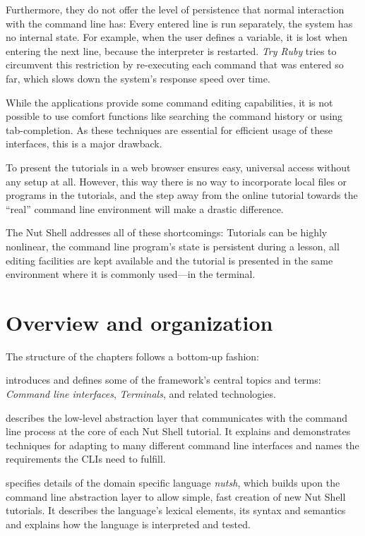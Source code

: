 \documentclass[paper=a4,twoside,abstract=on,cleardoublepage=empty,numbers=noenddot,toc=bib,toc=listof,12pt,appendixprefix=true]{scrreprt}
\begin{document}
Furthermore, they do not offer the level of persistence that normal interaction with the command line has: Every entered line is run separately, the system has no internal state. For example, when the user defines a variable, it is lost when entering the next line, because the interpreter is restarted. \emph{Try Ruby} tries to circumvent this restriction by re-executing each command that was entered so far, which slows down the system's response speed over time.

While the applications provide some command editing capabilities, it is not possible to use comfort functions like searching the command history or using tab-completion. As these techniques are essential for efficient usage of these interfaces, this is a major drawback.

To present the tutorials in a web browser ensures easy, universal access without any setup at all. However, this way there is no way to incorporate local files or programs in the tutorials, and the step away from the online tutorial towards the “real” command line environment will make a drastic difference.

The Nut Shell addresses all of these shortcomings: Tutorials can be highly nonlinear, the command line program's state is persistent during a lesson, all editing facilities are kept available and the tutorial is presented in the same environment where it is commonly used---in the terminal.

\section{Overview and organization}

The structure of the chapters follows a bottom-up fashion:

 introduces and defines some of the framework's central topics and terms: \emph{Command line interfaces}, \emph{Terminals}, and related technologies.

 describes the low-level abstraction layer that communicates with the command line process at the core of each Nut Shell tutorial. It explains and demonstrates techniques for adapting to many different command line interfaces and names the requirements the CLIs need to fulfill.

 specifies details of the domain specific language \emph{nutsh}, which builds upon the command line abstraction layer to allow simple, fast creation of new Nut Shell tutorials. It describes the language's lexical elements, its syntax and semantics and explains how the language is interpreted and tested.
\end{document}
